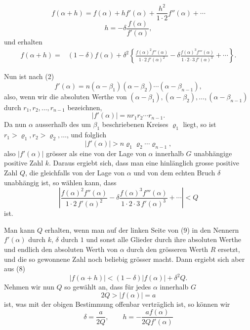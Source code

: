 
\begin{equation}
 f(\alpha+h)=f(\alpha)+h f'(\alpha)+\frac{h^2}{1\cdot2}f''(\alpha)+\cdots
\tag{6}
\end{equation}
\begin{equation}
 h=-\delta\frac{f(\alpha)}{f'(\alpha)},
\tag{7}
\end{equation}
und erhalten
\begin{align}
 f(\alpha+h)={}&(1-\delta)f(\alpha)
 +\delta^2\left\{\frac{f(\alpha)^2 f''(\alpha)}{1\cdot2\,f'(\alpha)^2}
 -\delta\frac{f(\alpha)^3 f'''(\alpha)}{1\cdot2\cdot3\,f'(\alpha)^3}+\cdots\right\}.
\tag{8}
\end{align}

Nun ist nach (2)
\[
 f'(\alpha)=n(\alpha-\beta_1)(\alpha-\beta_2)\cdots(\alpha-\beta_{n-1}),
\]
also, wenn wir die absoluten Werthe von $(\alpha-\beta_1),(\alpha-\beta_2),\ldots,(\alpha-\beta_{n-1})$ durch $r_1,r_2,
\ldots,r_{n-1}$ bezeichnen,
\[
 |f'(\alpha)|=nr_1r_2\cdots r_{n-1}.
\]
Da nun $\alpha$ ausserhalb des um $\beta_1$ beschriebenen Kreises $\varrho_1$ liegt, so ist $r_1>\varrho_1,r_2>\varrho_2,
\ldots$, und folglich
\[
 |f'(\alpha)|>n\varrho_1\varrho_2\cdots\varrho_{n-1},
\]
also $|f'(\alpha)|$ grösser als eine von der Lage von $\alpha$ innerhalb $G$ unabhängige positive Zahl $k$. Daraus ergiebt sich, dass man eine hinlänglich grosse positive Zahl $Q$, die gleichfalls von der Lage von $\alpha$ und von dem echten Bruch $\delta$ unabhängig ist, so wählen kann, dass
\begin{equation}
 \left|\frac{f(\alpha)^2f''(\alpha)}{1\cdot2\,f'(\alpha)^2}
 -\delta\frac{f(\alpha)^3f'''(\alpha)}{1\cdot2\cdot3\,f'(\alpha)^3}+\cdots\right|<Q
\tag{9}
\end{equation}
ist.

Man kann $Q$ erhalten, wenn man auf der linken Seite von (9) in den Nennern $f'(\alpha)$ durch $k$, $\delta$ durch $1$ und sonst alle Glieder durch ihre absoluten Werthe und endlich den absoluten Werth von $\alpha$ durch den grösseren Werth $R$ ersetzt, und die so gewonnene Zahl noch beliebig grösser macht. Dann ergiebt sich aber aus (8)
\begin{equation}
 |f(\alpha+h)|<(1-\delta)|f(\alpha)|+\delta^2Q.
\tag{10}
\end{equation}
Nehmen wir nun $Q$ so gewählt an, dass für jedes $\alpha$ innerhalb $G$
\[
 2Q>|f(\alpha)|=a
\]
ist, was mit der obigen Bestimmung offenbar verträglich ist, so können wir
\[
 \delta=\frac{a}{2Q},\qquad
 h=-\frac{a f(\alpha)}{2Q f'(\alpha)}
\]
